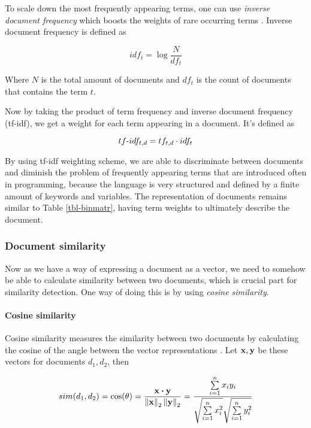 To scale down the most frequently appearing terms, one can use \emph{inverse document frequency} which boosts the weights of rare occurring terms \cite{Manning:2008:IIR:1394399}. Inverse document frequency is defined as

\begin{equation}
    idf_t = \log \dfrac{N}{df_t}
\end{equation}

\noindent
Where $N$ is the total amount of documents and $df_{t}$ is the count of documents that contains the term $t$.

Now by taking the product of term frequency and inverse document frequency (tf-idf), we get a weight for each term appearing in a document. It's defined as

\begin{equation}
    tf{\text -}idf_{t, d} = tf_{t, d} \cdot idf_{t}
\end{equation}

By using tf-idf weighting scheme, we are able to discriminate between documents and diminish the problem of frequently appearing terms that are introduced often in programming, because the language is very structured and defined by a finite amount of keywords and variables. The representation of documents remains similar to Table \ref{tbl-binmatr}, having term weights to ultimately describe the document.

\subsubsection{Document similarity}

Now as we have a way of expressing a document as a vector, we need to somehow be able to calculate similarity between two documents, which is crucial part for similarity detection. One way of doing this is by using \emph{cosine similarity}.

\paragraph{Cosine similarity}

Cosine similarity measures the similarity between two documents by calculating the cosine of the angle between the vector representations \cite{Manning:2008:IIR:1394399}. Let $\mathbf{x}, \mathbf{y}$ be these vectors for documents $d_1, d_2$, then

\begin{equation} \label{eq-cosine-orig}
    sim(d_1, d_2) = \cos(\theta) = \dfrac{\mathbf{x} \boldsymbol{\cdot} \mathbf{y}}
                          {\left\lVert\mathbf{x}\right\rVert_2 \left\lVert\mathbf{y}\right\rVert_2} = 
                          \dfrac{\sum \limits_{i=1}^n x_i y_i}
                                {\sqrt{\sum \limits_{i=1}^n {x}_i^2} \sqrt{\sum \limits_{i=1}^n y_i^2}}
\end{equation}

